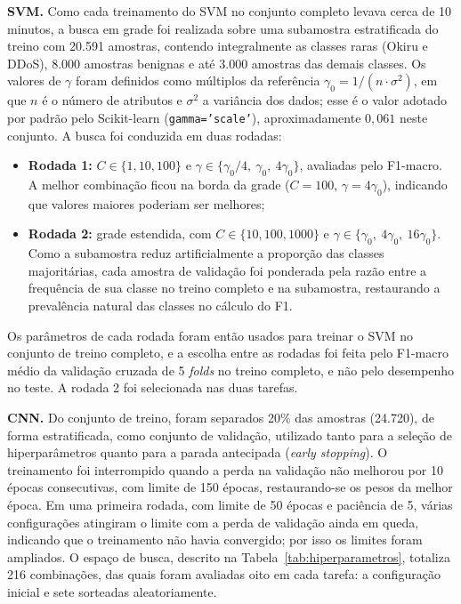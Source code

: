 \textbf{SVM.} Como cada treinamento do SVM no conjunto completo levava cerca de 10 minutos, a busca em grade foi realizada sobre uma subamostra estratificada do treino com 20.591 amostras, contendo integralmente as classes raras (Okiru e DDoS), 8.000 amostras benignas e até 3.000 amostras das demais classes. Os valores de $\gamma$ foram definidos como múltiplos da referência $\gamma_0 = 1/(n \cdot \sigma^2)$, em que $n$ é o número de atributos e $\sigma^2$ a variância dos dados; esse é o valor adotado por padrão pelo Scikit-learn (\texttt{gamma='scale'}), aproximadamente $0{,}061$ neste conjunto. A busca foi conduzida em duas rodadas:
\begin{itemize}
    \item \textbf{Rodada 1:} $C \in \{1, 10, 100\}$ e $\gamma \in \{\gamma_0/4,\ \gamma_0,\ 4\gamma_0\}$, avaliadas pelo F1-macro. A melhor combinação ficou na borda da grade ($C=100$, $\gamma=4\gamma_0$), indicando que valores maiores poderiam ser melhores;
    \item \textbf{Rodada 2:} grade estendida, com $C \in \{10, 100, 1000\}$ e $\gamma \in \{\gamma_0,\ 4\gamma_0,\ 16\gamma_0\}$. Como a subamostra reduz artificialmente a proporção das classes majoritárias, cada amostra de validação foi ponderada pela razão entre a frequência de sua classe no treino completo e na subamostra, restaurando a prevalência natural das classes no cálculo do F1.
\end{itemize}

Os parâmetros de cada rodada foram então usados para treinar o SVM no conjunto de treino completo, e a escolha entre as rodadas foi feita pelo F1-macro médio da validação cruzada de 5 \textit{folds} no treino completo, e não pelo desempenho no teste. A rodada 2 foi selecionada nas duas tarefas.

\textbf{CNN.} Do conjunto de treino, foram separados 20\% das amostras (24.720), de forma estratificada, como conjunto de validação, utilizado tanto para a seleção de hiperparâmetros quanto para a parada antecipada (\textit{early stopping}). O treinamento foi interrompido quando a perda na validação não melhorou por 10 épocas consecutivas, com limite de 150 épocas, restaurando-se os pesos da melhor época. Em uma primeira rodada, com limite de 50 épocas e paciência de 5, várias configurações atingiram o limite com a perda de validação ainda em queda, indicando que o treinamento não havia convergido; por isso os limites foram ampliados. O espaço de busca, descrito na Tabela~\ref{tab:hiperparametros}, totaliza 216 combinações, das quais foram avaliadas oito em cada tarefa: a configuração inicial e sete sorteadas aleatoriamente.


